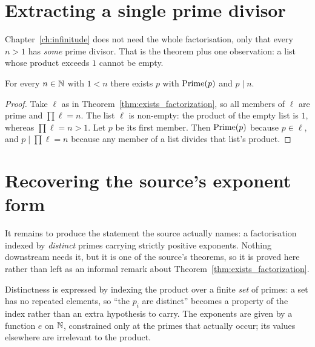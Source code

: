 \section{Extracting a single prime divisor}

Chapter~\ref{ch:infinitude} does not need the whole factorisation, only that
every $n > 1$ has \emph{some} prime divisor. That is the theorem plus one
observation: a list whose product exceeds $1$ cannot be empty.

\begin{corollary}
  \leanok
  \label{cor:exists_prime_dvd}
  For every $n \in \mathbb{N}$ with $1 < n$ there exists $p$ with $\mathrm{Prime}(p)$ and
  $p \mid n$.
\end{corollary}
\begin{proof}
  \leanok
  Take $\ell$ as in Theorem~\ref{thm:exists_factorization}, so all members of
  $\ell$ are prime and $\prod \ell = n$. The list $\ell$ is non-empty: the
  product of the empty list is $1$, whereas $\prod \ell = n > 1$. Let $p$ be its
  first member. Then $\mathrm{Prime}(p)$ because $p \in \ell$, and $p \mid \prod \ell = n$
  because any member of a list divides that list's product.
\end{proof}

\section{Recovering the source's exponent form}
\label{sec:exponent_form}

It remains to produce the statement the source actually names: a factorisation
indexed by \emph{distinct} primes carrying strictly positive exponents. Nothing
downstream needs it, but it is one of the source's theorems, so it is proved
here rather than left as an informal remark about
Theorem~\ref{thm:exists_factorization}.

Distinctness is expressed by indexing the product over a finite \emph{set} of
primes: a set has no repeated elements, so ``the $p_i$ are distinct'' becomes a
property of the index rather than an extra hypothesis to carry. The exponents are
given by a function $e$ on $\mathbb{N}$, constrained only at the primes that actually
occur; its values elsewhere are irrelevant to the product.

